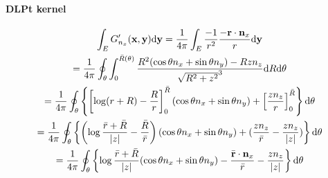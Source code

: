 \paragraph{DLPt kernel}

\begin{multline}
	\int_E G'_{n_x}({\bf x}, {\bf y}) \mathrm{d} {\bf y}
	= \frac{1}{4\pi} \int_{E} \frac{-1}{r^2} \frac{-{\bf r} \cdot {\bf n}_x }{r} \mathrm{d} {\bf y} \\
	= \frac{1}{4\pi} \oint_{\theta} \int_{0}^{\bar{R}(\theta)} \frac{R^2 (\cos\theta n_x + \sin\theta n_y) - R z n_z }{\sqrt{R^2 + z^2}^3}
	\mathrm{d} R \mathrm{d} \theta
	\\
	= \frac{1}{4\pi} \oint_{\theta} \left\{
	\left[ \log (r + R) - \frac{R}{r}\right]_{0}^{\bar{R}} (\cos\theta n_x + \sin\theta n_y)
	+ \left[ \frac{z n_z}{r} \right]_{0}^{\bar{R}}
	\right\} \mathrm{d} \theta
	\\
	= \frac{1}{4\pi} \oint_{\theta} \left\{
	\left(\log \frac{\bar{r} + \bar{R}}{|z|} - \frac{\bar{R}}{\bar{r}} \right) (\cos\theta n_x + \sin\theta n_y)
	+ (\frac{z n_z}{\bar{r}} - \frac{z n_z}{|z|})
	\right\} \mathrm{d} \theta
	\\
	= \frac{1}{4\pi} \oint_{\theta} \left\{
	\log \frac{\bar{r} + \bar{R}}{|z|}(\cos\theta n_x + \sin\theta n_y) - \frac{\bar{\bf r} \cdot {\bf n}_x}{\bar{r}} 
	- \frac{z n_z}{|z|}
	\right\} \mathrm{d} \theta
\end{multline}